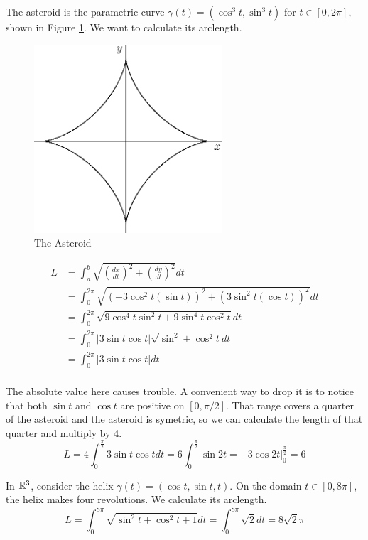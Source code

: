 \documentclass[fleqn,letterpaper]{report}
\begin{document}
\begin{example}
The asteroid is the parametric curve $\gamma(t) = (\cos^3 t,
\sin^3 t)$ for $t \in [0,2\pi]$, shown in Figure
\ref{figure-asteroid}. We want to calculate its arclength.

\begin{figure}[ht]
\centering
\includegraphics[width=7cm]{figure20.eps}
\caption{The Asteroid}
\label{figure-asteroid}
\end{figure}

\begin{align*}
L & = \int_a^b \sqrt{ \left( \frac{dx}{dt} \right)^2 + \left(
\frac{dy}{dt} \right)^2 } dt \\
& = \int_0^{2\pi} \sqrt{ (-3 \cos^2 t (\sin t))^2 + (3 \sin^2
t (\cos t))^2} dt \\
& = \int_0^{2\pi} \sqrt{ 9 \cos^4 t \sin^2 t + 9 \sin^4
t \cos^2 t} dt \\
& = \int_0^{2\pi} |3 \sin t \cos t | \sqrt{ \sin^2 + \cos^2 t} dt \\
& = \int_0^{2\pi} |3 \sin t \cos t | dt \\
\end{align*}

The absolute value here causes trouble. A convenient way to
drop it is to notice that both $\sin t$ and $\cos t$ are positive on
$[0, \pi/2]$. That range covers a quarter of the asteroid and
the asteroid is symetric, so we can calculate the length of that
quarter and multiply by 4.
\begin{equation*}
L = 4\int_0^{\frac{\pi}{2}} 3 \sin t \cos t dt = 
6 \int_0^{\frac{\pi}{2}} \sin 2t = \left. -3\cos 2t
\right|_0^{\frac{\pi}{2}} = 6
\end{equation*}
\end{example}

\begin{example} 
In $\mathbb{R}^3$, consider the helix $\gamma(t) = (\cos t, \sin t,
t)$. On the domain $t \in [0, 8\pi]$, the helix makes four
revolutions. We calculate its arclength.
\begin{equation*}
L = \int_0^{8\pi} \sqrt{ \sin^2 t + \cos^2 t + 1} dt =
\int_0^{8\pi} \sqrt{2} dt = 8 \sqrt{2} \pi
\end{equation*}
\end{example}
\end{document}
